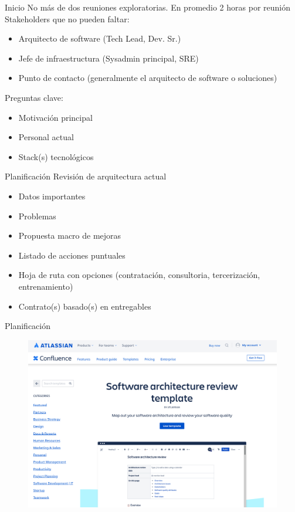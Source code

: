 \documentclass[aspectratio=169]{beamer}
\begin{document}
\begin{frame}{Inicio}
No más de dos reuniones exploratorias. En promedio 2 horas por reunión\\

Stakeholders que no pueden faltar:\\
\begin{itemize}
\item Arquitecto de software (Tech Lead, Dev. Sr.)
\item Jefe de infraestructura (Sysadmin principal, SRE)
\item Punto de contacto (generalmente el arquitecto de software o soluciones)
\end{itemize}

Preguntas clave:\\
\begin{itemize}
\item Motivación principal
\item Personal actual
\item Stack(s) tecnológicos 
\end{itemize}
\end{frame}

\begin{frame}{Planificación}
Revisión de arquitectura actual
\begin{itemize}
\item Datos importantes
\item Problemas
\item Propuesta macro de mejoras
\item Listado de acciones puntuales
\item Hoja de ruta con opciones (contratación, consultoria, tercerización, entrenamiento)
\item Contrato(s) basado(s) en entregables
\end{itemize}
\end{frame}

\begin{frame}{Planificación}
\begin{figure}
\centering
\includegraphics[width=\linewidth]{Images/atlassian}
\end{figure}
\end{frame}
\end{document}
